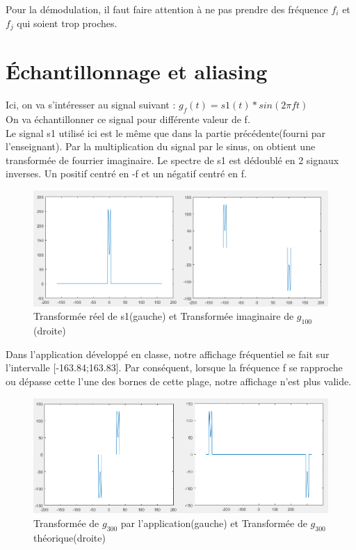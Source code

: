 \documentclass[10pt,a4paper]{article}
\begin{document}
Pour la démodulation, il faut faire attention à ne pas prendre des fréquence $f_i$ et $f_j$ qui soient trop proches.




\newpage

\section{Échantillonnage et aliasing	}

Ici, on va s'intéresser au signal suivant :
$g_f(t) = s1(t)*sin(2 \pi f t)$\\
On va échantillonner ce signal pour différente valeur de f.\\
Le signal s1 utilisé ici est le même que dans la partie précédente(fourni par l'enseignant).
Par la multiplication du signal par le sinus, on obtient une transformée de fourrier imaginaire. Le spectre de s1 est dédoublé en 2 signaux inverses. Un positif centré en -f et un négatif centré en f.

\begin{figure}[H]	\begin{center}
\includegraphics[scale=0.6]{aliasing1.png}
\caption{Transformée réel de s1(gauche) et Transformée imaginaire de $g_{100}$(droite)}
\label{XX}
\end{center}	\end{figure}

Dans l'application développé en classe, notre affichage fréquentiel se fait sur l'intervalle [-163.84;163.83]. Par conséquent, lorsque la fréquence f se rapproche ou dépasse cette l'une des bornes de cette plage, notre affichage n'est plus valide.

\begin{figure}[H]	\begin{center}
\includegraphics[scale=0.6]{aliasing2.png}
\caption{Transformée de $g_{300}$ par l'application(gauche) et Transformée de $g_{300}$ théorique(droite)}
\label{XX}
\end{center}	\end{figure}
\end{document}

